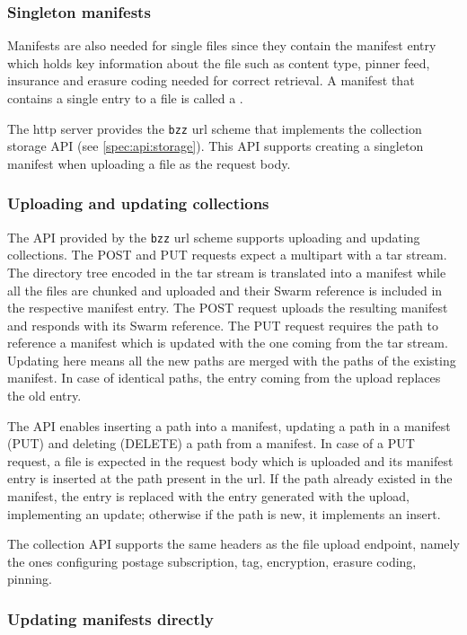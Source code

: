 \subsubsection{Singleton manifests}

Manifests are also needed for single files since they contain the manifest entry which holds key information about the file such as content type, pinner feed, insurance and erasure coding needed for correct retrieval. A manifest that contains a single entry to a file is called a .

The http server provides the \texttt{bzz} url scheme that implements the collection storage API (see  \ref{spec:api:storage}). This API supports creating a singleton manifest when uploading a file as the request body. 

\subsubsection{Uploading and updating collections}

The API provided by the \texttt{bzz} url scheme supports uploading and updating collections. The POST and PUT requests expect a multipart with a tar stream. The directory  tree encoded in the tar stream is translated into a manifest while all the files are chunked and uploaded and their Swarm reference is included in the respective manifest entry. The POST request uploads the resulting manifest and responds with  its Swarm reference. The PUT request requires the path to reference a manifest which is updated with the one coming from the tar stream. Updating here means all the new paths are merged with the paths of the existing  manifest. In case of identical paths, the entry coming from the upload replaces the old entry.

The  API enables inserting a path into a manifest, updating a path in a manifest (PUT) and deleting (DELETE)  a path from a manifest. In case of a PUT request, a file is expected in the request body which is uploaded and its manifest entry is inserted at the path present in the url. If the path already existed in the manifest, the entry is replaced with the entry generated with the upload, implementing an update; otherwise if the path is new, it implements an insert. 

The collection API supports the same headers as the file upload endpoint, namely the ones configuring postage subscription, tag, encryption, erasure coding, pinning.

\subsubsection{Updating manifests directly}

